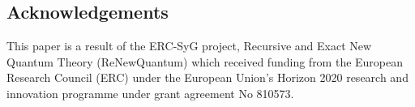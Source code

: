 \documentclass{article}
\theoremstyle{plain}
\newcommand{\C}{\mathbb{C}}
\newcommand{\holoL}[1]{\mathcal{H}L^{#1}} %
\begin{document}



\subsection{Acknowledgements}

This paper is a result of the ERC-SyG project, Recursive and Exact New Quantum Theory (ReNewQuantum) which received funding from the European Research Council (ERC) under the European Union's Horizon 2020 research and innovation programme under grant agreement No 810573. 
\end{document}
